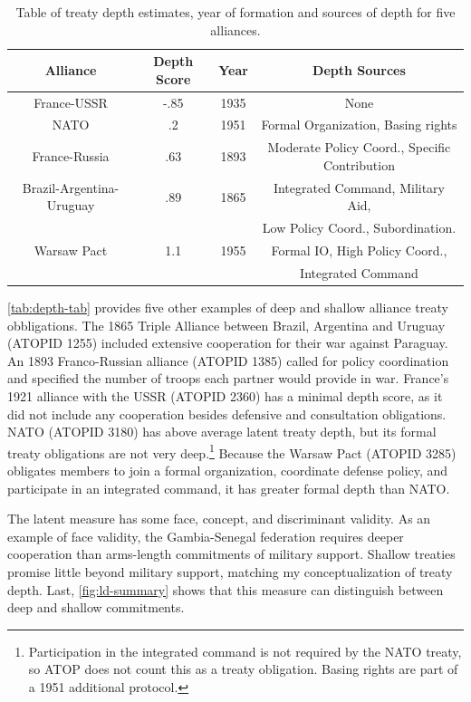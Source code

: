 \documentclass[12pt]{article}
\begin{document}
\begin{table}[hbt!]
\begin{center}
\begin{tabular}{cccc}
   Alliance  & Depth Score & Year & Depth Sources  \\
\hline
 France-USSR   & -.85  & 1935  & None \\
 NATO & .2 & 1951 & Formal Organization, Basing rights \\ 
 France-Russia   & .63 & 1893 & Moderate Policy Coord., Specific Contribution \\
 Brazil-Argentina-Uruguay & .89 & 1865 & Integrated Command, Military Aid, \\
                         &      &      &  Low Policy Coord., Subordination. \\
 Warsaw Pact & 1.1  & 1955 &  Formal IO, High Policy Coord., \\
             &      &      & Integrated Command  \\ 
\hline
\end{tabular}
\caption{Table of treaty depth estimates, year of formation and sources of depth for five alliances. }
\label{tab:depth-tab}
\end{center} 
\end{table}


\autoref{tab:depth-tab} provides five other examples of deep and shallow alliance treaty obbligations.  
The 1865 Triple Alliance between Brazil, Argentina and Uruguay (ATOPID 1255) included extensive cooperation for their war against Paraguay. 
An 1893 Franco-Russian alliance (ATOPID 1385) called for policy coordination and specified the number of troops each partner would provide in war. 
France's 1921 alliance with the USSR (ATOPID 2360) has a minimal depth score, as it did not include any cooperation besides defensive and consultation obligations. 
NATO (ATOPID 3180) has above average latent treaty depth, but its formal treaty obligations are not very deep.\footnote{Participation in the integrated command is not required by the NATO treaty, so ATOP does not count this as a treaty obligation. Basing rights are part of a 1951 additional protocol.}
Because the Warsaw Pact (ATOPID 3285) obligates members to join a formal organization, coordinate defense policy, and participate in an integrated command, it has greater formal depth than NATO. 


The latent measure has some face, concept, and discriminant validity. 
As an example of face validity, the Gambia-Senegal federation requires deeper cooperation than arms-length commitments of military support. 
Shallow treaties promise little beyond military support, matching my conceptualization of treaty depth. 
Last, \autoref{fig:ld-summary} shows that this measure can distinguish between deep and shallow commitments. 
\end{document}
